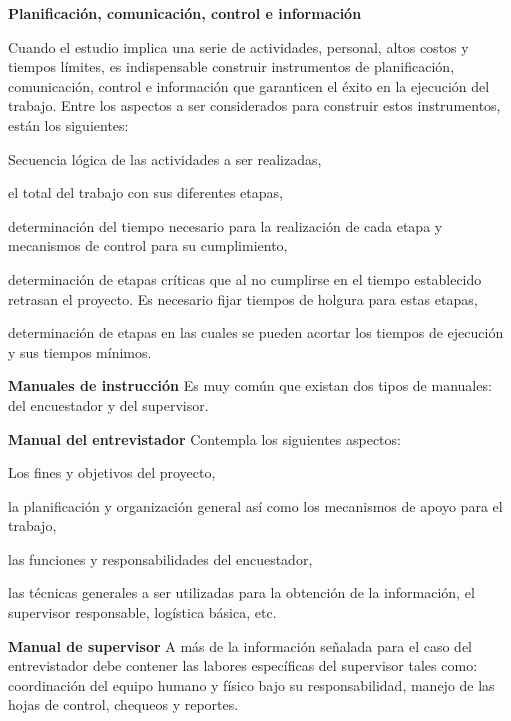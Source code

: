 \documentclass[a5paper,doc,10pt,noapacite]{apa6}
\newcommand{\neodefi}[1]{%
	\vspace{1\baselineskip}
	\textbf{\small#1} \newline
}
\begin{document}
{{	
\neodefi{Planificación, comunicación, control e información}
	Cuando el estudio implica una serie de actividades, personal, altos costos y tiempos límites, es indispensable construir instrumentos de planificación, comunicación, control e información que garanticen el éxito en la ejecución del trabajo. Entre los aspectos a ser considerados para construir estos instrumentos, están los siguientes:
	\begin{APAitemize}
		\item Secuencia lógica de las actividades a ser realizadas,
		\item el total del trabajo con sus diferentes etapas,
		\item determinación del tiempo necesario para la realización de cada etapa y mecanismos de control para su cumplimiento,
		\item determinación de etapas críticas que al no cumplirse en el tiempo establecido retrasan el proyecto. Es necesario fijar tiempos de holgura para estas etapas,
		\item determinación de etapas en las cuales se pueden acortar los tiempos de ejecución y sus tiempos mínimos.
	\end{APAitemize}
	
	\vspace{0.75\baselineskip}
	\textbf{Manuales de instrucción}\newline
	Es muy común que existan dos tipos de manuales: del encuestador y del supervisor.
	
	\vspace{0.75\baselineskip}
	\textbf{Manual del entrevistador}\newline
	Contempla los siguientes aspectos:
	\begin{APAitemize}
		\item Los fines y objetivos del proyecto,
		\item la planificación y organización general así como los mecanismos de apoyo para el trabajo,
		\item las funciones y responsabilidades del encuestador,
		\item las técnicas generales a ser utilizadas para la obtención de la información, el supervisor responsable, logística básica, etc.
	\end{APAitemize}
	
	\vspace{0.75\baselineskip}
	\textbf{Manual de supervisor}\newline
	A más de la información señalada para el caso del entrevistador debe contener las labores específicas del supervisor tales como: coordinación del equipo humano y físico bajo su responsabilidad, manejo de las hojas de control, chequeos y reportes.
	
}}
\end{document}
